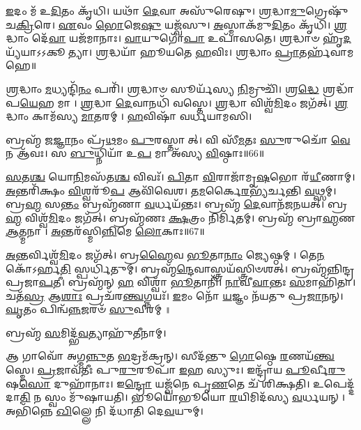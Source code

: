 \-\ul{𑌇}\-𑌦𑌂 𑌮᳴ 𑌉\-\ul{𑌦𑌿}\-𑌤𑌂 𑌕𑍃᳴𑌧𑌿।
𑌯𑌥𑌾᳴ \ul{𑌦𑍇}\-𑌵𑌾 𑌅𑌸𑍁᳴𑌰𑍇𑌷𑍁।
\-\ul{𑌶𑍍𑌰}\-𑌦𑍍𑌧𑌾\-\ul{𑌮𑍁}\-𑌗𑍍𑌰𑍇𑌷𑍁᳴ 𑌚\-\ul{𑌕𑍍𑌰𑌿}\-𑌰𑍇।
\-\ul{𑌏}\-𑌵𑌂 \ul{𑌭𑍋}\-𑌜𑍇\-\ul{𑌷𑍁} 𑌯𑌜𑍍𑌵᳴𑌸𑍁।
\-\ul{𑌅}\-𑌸𑍍𑌮𑌾𑌕᳴𑌮𑍁\-\ul{𑌦𑌿}\-𑌤𑌂 𑌕𑍃᳴𑌧𑌿।
\-\ul{𑌶𑍍𑌰}\-𑌦𑍍𑌧𑌾𑌂 𑌦𑍇᳴\-\ul{𑌵𑌾} 𑌯𑌜᳴𑌮𑌾𑌨𑌾𑌃।
\-\ul{𑌵𑌾}\-𑌯𑍁𑌗𑍋᳴\-\ul{𑌪𑌾} 𑌉𑌪𑌾᳴𑌸𑌤𑍇।
\-\ul{𑌶𑍍𑌰}\-𑌦𑍍𑌧𑌾𑍞 𑌹𑍃᳴\-\ul{𑌦}\-𑌯𑍍𑌯᳴𑌯𑌾𑌽𑌽𑌕𑍂𑌤𑍍𑌯𑌾।
\-\ul{𑌶𑍍𑌰}\-𑌦𑍍𑌧𑌯𑌾᳴ 𑌹𑍂𑌯𑌤𑍇 \ul{𑌹}\-𑌵𑌿𑌃।
\-\ul{𑌶𑍍𑌰}\-𑌦𑍍𑌧𑌾𑌂 \ul{𑌪𑍍𑌰𑌾}\-𑌤𑌰𑍍\mbox{}𑌹᳴𑌵𑌾𑌮𑌹𑍇॥

\-\ul{𑌶𑍍𑌰}\-𑌦𑍍𑌧𑌾𑌂 \ul{𑌮}\-𑌧𑍍𑌯𑌨𑍍𑌦𑌿᳴\-\ul{𑌨𑌂} 𑌪𑌰𑌿᳴।
\-\ul{𑌶𑍍𑌰}\-𑌦𑍍𑌧𑌾𑍞 𑌸𑍂𑌰𑍍𑌯᳴𑌸𑍍𑌯 \ul{𑌨𑌿}\-𑌮𑍍𑌰𑍁𑌚𑌿᳴।
𑌶𑍍𑌰\-\ul{𑌦𑍍𑌧𑍇} 𑌶𑍍𑌰𑌦𑍍𑌧𑌾᳴𑌪\-\ul{𑌯𑍇}\-𑌹 𑌮𑌾।
\-\ul{𑌶𑍍𑌰}\-𑌦𑍍𑌧𑌾 \ul{𑌦𑍇}\-𑌵𑌾𑌨𑌧𑌿᳴ 𑌵𑌸𑍍𑌤𑍇।
\-\ul{𑌶𑍍𑌰}\-𑌦𑍍𑌧𑌾 𑌵𑌿𑌶𑍍𑌵᳴\-\ul{𑌮𑌿}\-𑌦𑌂 𑌜𑌗᳴𑌤𑍍।
\-\ul{𑌶𑍍𑌰}\-𑌦𑍍𑌧𑌾𑌂 𑌕𑌾𑌮᳴𑌸𑍍𑌯 \ul{𑌮𑌾}\-𑌤𑌰𑌮𑍍।
\-\ul{𑌹}\-𑌵𑌿𑌷𑌾᳴ 𑌵𑌰𑍍𑌧𑌯𑌾𑌮𑌸𑌿।

𑌬𑍍𑌰𑌹𑍍𑌮᳴ 𑌜\-\ul{𑌜𑍍𑌞𑌾}\-𑌨𑌂 𑌪𑍍𑌰᳴\-\ul{𑌥}\-𑌮𑌂 \ul{𑌪𑍁}\-𑌰𑌸𑍍𑌤𑌾𑌤𑍍।
𑌵𑌿 𑌸𑍀᳴\-\ul{𑌮}\-𑌤𑌃 \ul{𑌸𑍁}\-𑌰𑍁𑌚𑍋᳴ \ul{𑌵𑍇}\-𑌨 𑌆᳴𑌵𑌃।
𑌸 \ul{𑌬𑍁}\-𑌧𑍍𑌨𑌿𑌯𑌾᳴ 𑌉\-\ul{𑌪} 𑌮𑌾 𑌅᳴𑌸𑍍𑌯 \ul{𑌵𑌿}\-𑌷𑍍𑌠𑌾𑌃॥66॥

\-\ul{𑌸}\-𑌤\-\ul{𑌶𑍍𑌚} 𑌯𑍋\-\ul{𑌨𑌿}\-𑌮𑌸᳴𑌤\-\ul{𑌶𑍍𑌚} 𑌵𑌿𑌵𑌃᳴।
\-\ul{𑌪𑌿}\-𑌤𑌾 \ul{𑌵𑌿}\-𑌰𑌾𑌜𑌾᳴𑌮𑍃\-\ul{𑌷}\-𑌭𑍋 𑌰᳴\-\ul{𑌯𑍀}\-𑌣𑌾𑌮𑍍।
\-\ul{𑌅}\-𑌨𑍍𑌤𑌰𑌿᳴𑌕𑍍𑌷𑌂 \ul{𑌵𑌿}\-𑌶𑍍𑌵𑌰𑍂᳴\-\ul{𑌪} 𑌆𑌵𑌿᳴𑌵𑍇𑌶।
𑌤\-\ul{𑌮}\-𑌰𑍍𑌕𑍈\-\ul{𑌰}\-𑌭𑍍𑌯᳴𑌰𑍍𑌚𑌨𑍍𑌤𑌿 \ul{𑌵}\-𑌥𑍍𑌸𑌮𑍍।
𑌬𑍍𑌰\-\ul{𑌹𑍍𑌮} 𑌸\-\ul{𑌨𑍍𑌤𑌂} 𑌬𑍍𑌰𑌹𑍍𑌮᳴𑌣𑌾 \ul{𑌵}\-𑌰𑍍𑌧𑌯᳴𑌨𑍍𑌤𑌃।
𑌬𑍍𑌰𑌹𑍍𑌮᳴ \ul{𑌦𑍇}\-𑌵𑌾𑌨᳴𑌜𑌨𑌯𑌤𑍍।
𑌬𑍍𑌰\-\ul{𑌹𑍍𑌮} 𑌵𑌿𑌶𑍍𑌵᳴\-\ul{𑌮𑌿}\-𑌦𑌂 𑌜𑌗᳴𑌤𑍍।
𑌬𑍍𑌰𑌹𑍍𑌮᳴𑌣𑌃 \ul{𑌕𑍍𑌷}\-𑌤𑍍𑌰𑌂 𑌨𑌿𑌰𑍍𑌮𑌿᳴𑌤𑌮𑍍।
𑌬𑍍𑌰𑌹𑍍𑌮᳴ 𑌬𑍍𑌰𑌾\-\ul{𑌹𑍍𑌮}\-𑌣 \ul{𑌆}\-𑌤𑍍𑌮𑌨𑌾।
\-\ul{𑌅}\-𑌨𑍍𑌤𑌰᳴𑌸𑍍𑌮𑌿\-\ul{𑌨𑍍𑌨𑌿}\-𑌮𑍇 \ul{𑌲𑍋}\-𑌕𑌾𑌃॥67॥

\-\ul{𑌅}\-𑌨𑍍𑌤𑌰𑍍𑌵𑌿𑌶𑍍𑌵᳴\-\ul{𑌮𑌿}\-𑌦𑌂 𑌜𑌗᳴𑌤𑍍।
𑌬𑍍𑌰\-\ul{𑌹𑍍𑌮𑍈}\-𑌵 \ul{𑌭𑍂}\-𑌤𑌾\-\ul{𑌨𑌾𑌂} 𑌜𑍍𑌯𑍇𑌷𑍍𑌠𑌮𑍍।
𑌤𑍇\-\ul{𑌨} 𑌕𑍋᳴𑌽𑌰𑍍\mbox{}𑌹\-\ul{𑌤𑌿} 𑌸𑍍𑌪𑌰𑍍𑌧𑌿᳴𑌤𑍁𑌮𑍍।
𑌬𑍍𑌰𑌹𑍍𑌮᳴\-\ul{𑌨𑍍𑌦𑍇}\-𑌵𑌾𑌸𑍍𑌤𑍍𑌰𑌯᳴𑌸𑍍𑌤𑍍𑌰𑌿𑍞𑌶𑌤𑍍।
𑌬𑍍𑌰𑌹𑍍𑌮᳴𑌨𑍍𑌨𑌿𑌨𑍍𑌦𑍍𑌰𑌪𑍍𑌰𑌜𑌾\-\ul{𑌪}\-𑌤𑍀।
𑌬𑍍𑌰𑌹𑍍𑌮᳴𑌨𑍍 \ul{𑌹} 𑌵𑌿𑌶𑍍𑌵𑌾᳴ \ul{𑌭𑍂}\-𑌤𑌾𑌨𑌿᳴।
\-\ul{𑌨𑌾}\-𑌵𑍀\-\ul{𑌵𑌾}\-𑌨𑍍𑌤𑌃 \ul{𑌸}\-𑌮𑌾𑌹𑌿᳴𑌤𑌾।
𑌚𑌤᳴\-\ul{𑌸𑍍𑌰} 𑌆\-\ul{𑌶𑌾𑌃} 𑌪𑍍𑌰𑌚᳴𑌰\-\ul{𑌨𑍍𑌤𑍍𑌵}\-𑌗𑍍𑌨𑌯𑌃᳴।
\-\ul{𑌇}\-𑌮𑌂 𑌨𑍋᳴ \ul{𑌯}\-𑌜𑍍𑌞𑌂 𑌨᳴𑌯𑌤𑍁 𑌪𑍍𑌰\-\ul{𑌜𑌾}\-𑌨𑌨𑍍।
\-\ul{𑌘𑍃}\-𑌤𑌂 𑌪𑌿𑌨𑍍𑌵᳴\-\ul{𑌨𑍍𑌨}\-𑌜𑌰𑍞᳴ \ul{𑌸𑍁}\-𑌵𑍀𑌰𑌮𑍍॥

𑌬𑍍𑌰𑌹𑍍𑌮᳴ \ul{𑌸}\-𑌮𑌿𑌦𑍍𑌭᳴\-\ul{𑌵}\-𑌤𑍍𑌯𑌾𑌹𑍁᳴𑌤𑍀𑌨𑌾𑌮𑍍।

𑌆 𑌗𑌾𑌵𑍋᳴ 𑌅𑌗𑍍𑌮\-\ul{𑌨𑍍𑌨𑍁}\-𑌤 \ul{𑌭}\-𑌦𑍍𑌰𑌮᳴𑌕𑍍𑌰𑌨𑍍।
𑌸𑍀𑌦᳴𑌨𑍍𑌤𑍁 \ul{𑌗𑍋}\-𑌷𑍍𑌠𑍇 \ul{𑌰}\-𑌣𑌯᳴\-\ul{𑌨𑍍𑌤𑍍𑌵}\-𑌸𑍍𑌮𑍇।
\-\ul{𑌪𑍍𑌰}\-𑌜𑌾𑌵᳴𑌤𑍀𑌃 𑌪𑍁\-\ul{𑌰𑍁}\-𑌰𑍂𑌪𑌾᳴ \ul{𑌇}\-𑌹 𑌸𑍍𑌯𑍁𑌃।
𑌇𑌨𑍍𑌦𑍍𑌰𑌾᳴𑌯 \ul{𑌪𑍂}\-𑌰𑍍𑌵𑍀\-\ul{𑌰𑍁}\-𑌷\-\ul{𑌸𑍋} 𑌦𑍁𑌹𑌾᳴𑌨𑌾𑌃।
𑌇\-\ul{𑌨𑍍𑌦𑍍𑌰𑍋} 𑌯𑌜𑍍𑌵᳴𑌨𑍇 𑌪𑍃\-\ul{𑌣}\-𑌤𑍇 𑌚᳴ 𑌶𑌿𑌕𑍍𑌷𑌤𑌿।
𑌉𑌪𑍇𑌦𑍍𑌦᳴𑌦𑌾\-\ul{𑌤𑌿} 𑌨 𑌸𑍍𑌵𑌂 𑌮𑍁᳴𑌷𑌾𑌯𑌤𑌿।
𑌭𑍂𑌯𑍋᳴𑌭𑍂𑌯𑍋 \ul{𑌰}\-𑌯𑌿𑌮𑌿𑌦᳴𑌸𑍍𑌯 \ul{𑌵}\-𑌰𑍍𑌧𑌯𑌨𑍍।
𑌅𑌭𑌿᳴𑌨𑍍𑌨𑍇 \ul{𑌖𑌿}\-𑌲𑍍𑌲𑍇 𑌨𑌿 𑌦᳴𑌧𑌾𑌤𑌿 𑌦𑍇\-\ul{𑌵}\-𑌯𑍁𑌮𑍍।

